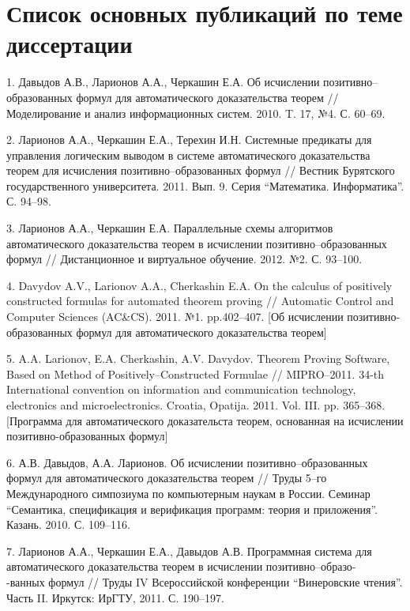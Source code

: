 \documentclass[a4paper]{report}
\begin{document}
\section*{Список основных публикаций по теме диссертации}

1. Давыдов А.В., Ларионов А.А., Черкашин Е.А. Об исчислении
по\-зи\-тив\-но--обра\-зо\-ван\-ных формул для автоматического доказательства
теорем // Моделирование и анализ информационных систем. 2010. T. 17, №4. С. 60--69.

2. Ларионов А.А., Черкашин Е.А., Терехин И.Н. Системные предикаты для
управления логическим выводом в системе автоматического доказательства
теорем для исчисления позитивно--образованных формул // Вестник
Бурятского государственного университета. 2011. Вып. 9. Серия
``Математика. Информатика''. С. 94--98.

3. Ларионов А.А., Черкашин Е.А. Параллельные схемы алгоритмов
автоматического доказательства теорем в исчислении
позитивно--образованных формул // Дистанционное и виртуальное
обучение. 2012. №2. С. 93--100.

4. Davydov A.V., Larionov A.A., Cherkashin E.A. On the calculus of
positively constructed formulas for automated theorem proving //
Automatic Control and Computer Sciences (AC\&CS). 2011. №1. pp.402--407. [Об исчислении позитивно-образованных формул для автоматического доказательства теорем]


5. A.A. Larionov, E.A. Cherkashin, A.V. Davydov. Theorem Proving
Software, Based on Method of Positively--Constructed Formulae // MIPRO--2011. 34-th International convention on information and communication
technology, electronics and microelectronics. Croatia, Opatija. 2011. Vol. III. pp. 365--368. [Программа для автоматического доказательста теорем, основанная на исчислении позитивно-образованных формул]

6. А.В. Давыдов, А.А. Ларионов. Об исчислении позитивно--образованных
формул для автоматического доказательства теорем // Труды 5--го
Международного симпозиума по компьютерным наукам в России. Семинар
``Семантика, спецификация и верификация программ: теория и приложения''. Казань. 2010. С. 109--116.

7. Ларионов А.А., Черкашин Е.А., Давыдов А.В. Программная система для
автоматического доказательства теорем в исчислении
позитивно--образо-\\-ванных формул // Труды IV
Всероссийской конференции ``Винеровские чтения''. Часть II. Иркутск: ИрГТУ, 2011. С. 190--197.
\end{document}
